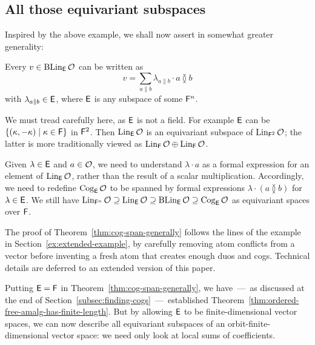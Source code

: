 \subsection{All those equivariant subspaces}\label{sec:equivariant-subspaces}
Inspired by the above example, we shall now assert in somewhat greater generality:

\begin{theorem}\label{thm:cog-span-generally}
    Every $v \in \Ker_\EE \cal O$ can be written as
    \[
        v = \sum_{a \parallel b} \lambda_{a \parallel b} \cdot a \between b
    \]
    with $\lambda_{a \parallel b} \in \EE$,
    where $\EE$ is any subspace of some $\FF^n$.
\end{theorem}

\begin{remark}\label{rem:FF-EE}
We must tread carefully here, as $\EE$ is not a field.
For example $\EE$ can be $\{ (\kappa, -\kappa) \mid \kappa \in \FF \}$ in $\FF^2$. 
Then $\Lin_\EE \cal O$ is an equivariant subspace of $\Lin_{\FF^2} \cal O$; 
the latter is more traditionally viewed as $\Lin_\FF \cal O \oplus \Lin_\FF \cal O$.

Given $\lambda \in \EE$ and $a \in \cal O$, we need to understand
\(
    \lambda \cdot a
\)
as a formal expression for an element of $\Lin_\EE \cal O$, rather than the result of a scalar multiplication.
Accordingly, we need to redefine $\Cog_\EE\cal O$ to be spanned by formal expressions $\lambda\cdot(a \between b)$ for $\lambda\in\EE$. 
We still have $\Lin_{\FF^n} \cal O \supseteq \Lin_\EE \cal O \supseteq \Ker_\EE \cal O \supseteq \Cog_\EE \cal O$ as equivariant spaces over $\FF$.
\lipicsEnd\end{remark}

The proof of Theorem~\ref{thm:cog-span-generally} follows the lines of the example in Section~\ref{ex:extended-example}, by carefully removing atom conflicts from a vector before inventing a fresh atom that creates enough duos and cogs. Technical details are deferred to an extended version of this paper.

Putting $\EE = \FF$ in Theorem~\ref{thm:cog-span-generally}, we have~---~as discussed at the end of Section~\ref{subsec:finding-cogs}~---~established Theorem~\ref{thm:ordered-free-amalg-has-finite-length}.
But by allowing $\EE$ to be finite-dimensional vector spaces, we can now describe all equivariant subspaces of an orbit-finite-dimensional vector space: 
we need only look at local sums of coefficients.

